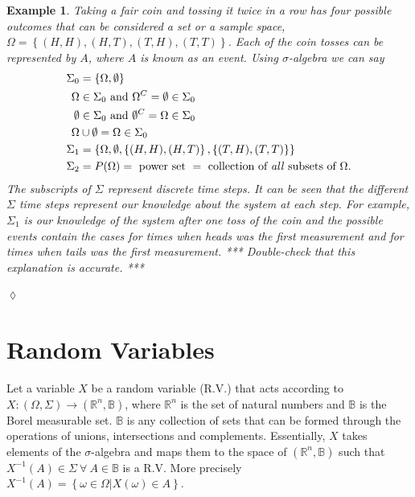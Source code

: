 \documentclass[lecture,12pt,]{pcms-l}
\theoremstyle{example}
\newtheorem{example}{Example}[section]
\begin{document}
\begin{example}
Taking a fair coin and tossing it twice in a row has four possible outcomes that can be considered a set or a sample space, $\Omega = \left\lbrace (H,H), (H,T), (T,H), (T,T) \right\rbrace$. Each of the coin tosses can be represented by $A$, where $A$ is known as an event. Using $\sigma$-algebra we can say
\begin{align*}
\Sigma_0 &= \left\lbrace \Omega, \emptyset \right\rbrace \\
\Omega &\in \Sigma_0 \textnormal{ and } \Omega^C = \emptyset \in \Sigma_0 \\
\emptyset &\in \Sigma_0 \textnormal{ and } \emptyset^C = \Omega \in \Sigma_0 \\
\Omega &\cup \emptyset = \Omega \in \Sigma_0 \\
\Sigma_1 &= \left\lbrace \Omega, \emptyset, \left\lbrace (H,H), (H,T) \right\rbrace, \left\lbrace (T,H), (T,T) \right\rbrace \right\rbrace \\
\Sigma_2 &= P(\Omega) = \textnormal{ power set } = \textnormal{ collection of \textit{all} subsets of } \Omega.
\end{align*}
The subscripts of $\Sigma$ represent discrete time steps. It can be seen that the different $\Sigma$ time steps represent our knowledge about the system at each step. For example, $\Sigma_1$ is our knowledge of the system after one toss of the coin and the possible events contain the cases for times when heads was the first measurement and for times when tails was the first measurement. *** Double-check that this explanation is accurate. ***
\end{example}
$\lozenge$

\section{Random Variables}
Let a variable $X$ be a random variable (R.V.) that acts according to \\
$X: (\Omega, \Sigma) \to (\mathbb{R}^n, \mathbb{B})$, where $\mathbb{R}^n$ is the set of natural numbers and $\mathbb{B}$ is the Borel measurable set. $\mathbb{B}$ is any collection of sets that can be formed through the operations of unions, intersections and complements. Essentially, $X$ takes elements of the $\sigma$-algebra and maps them to the space of $(\mathbb{R}^n, \mathbb{B})$ such that $X^{-1}(A) \in \Sigma ~ \forall ~ A \in \mathbb{B}$ is a R.V. More precisely $X^{-1}(A) = \left\lbrace \omega \in \Omega | X(\omega) \in A \right\rbrace$.
\end{document}
